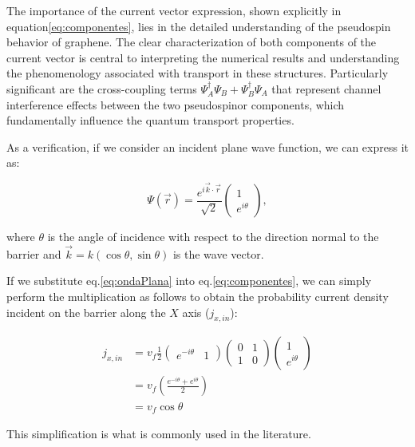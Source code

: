 The importance of the current vector expression, shown explicitly in equation\eqref{eq:componentes}, lies in the detailed understanding of the pseudospin behavior of graphene.
The clear characterization of both components of the current vector is central to interpreting the numerical results and understanding the phenomenology associated with transport in these structures.
Particularly significant are the cross-coupling terms $\Psi_A^\dagger\Psi_B + \Psi_B^\dagger\Psi_A$ that represent channel interference effects between the two pseudospinor components, which fundamentally influence the quantum transport properties.

As a verification, if we consider an incident plane wave function, we can express it as:

\begin{equation}
    \label{eq:ondaPlana}
    \Psi(\vec{r})=\frac{e^{i\vec{k}\cdot\vec{r}}}{\sqrt{2}}
    \begin{pmatrix}
        1 \\ e^{i\theta}
    \end{pmatrix},
\end{equation}

\noindent where $\theta$ is the angle of incidence with respect to the direction normal to the barrier and $\vec{k} = k(\cos\theta,\sin\theta)$ is the wave vector.

If we substitute eq.\eqref{eq:ondaPlana} into eq.\eqref{eq:componentes}, we can simply perform the multiplication as follows to obtain the probability current density incident on the barrier along the $X$ axis ($j_{x,in}$):

\begin{align}
    \label{eq:jdemostrada}
    j_{x, in}&=v_f\frac{1}{2}
    \begin{pmatrix}
        e^{-i\theta} & 1
    \end{pmatrix}
    \begin{pmatrix}
        0 & 1 \\
        1 & 0
    \end{pmatrix}
    \begin{pmatrix}
        1 \\ e^{i\theta}
    \end{pmatrix}\nonumber \\
    &=v_f\left( \frac{e^{-i\theta} + e^{i\theta}}{2} \right)\nonumber \\
    &=v_f\cos\theta
\end{align}

This simplification is what is commonly used in the literature\cite{DahalJPhysChemSolids2017, WuJAP2009}.

